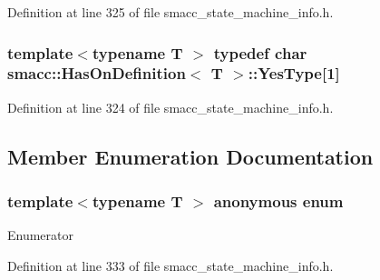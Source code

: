 Definition at line 325 of file smacc\+\_\+state\+\_\+machine\+\_\+info.\+h.

\subsubsection[{\texorpdfstring{Yes\+Type}{YesType}}]{\setlength{\rightskip}{0pt plus 5cm}template$<$typename T $>$ typedef char {\bf smacc\+::\+Has\+On\+Definition}$<$ T $>$\+::Yes\+Type\mbox{[}1\mbox{]}\hspace{0.3cm}{\ttfamily [private]}}\hypertarget{classsmacc_1_1HasOnDefinition_af147416543b9d5a19d3dfc4f3f0d42a6}{}\label{classsmacc_1_1HasOnDefinition_af147416543b9d5a19d3dfc4f3f0d42a6}


Definition at line 324 of file smacc\+\_\+state\+\_\+machine\+\_\+info.\+h.



\subsection{Member Enumeration Documentation}
\subsubsection[{\texorpdfstring{anonymous enum}{anonymous enum}}]{\setlength{\rightskip}{0pt plus 5cm}template$<$typename T $>$ anonymous enum}\hypertarget{classsmacc_1_1HasOnDefinition_a42ed2a75557706765cc75f0454d612db}{}\label{classsmacc_1_1HasOnDefinition_a42ed2a75557706765cc75f0454d612db}
\begin{Desc}
\item[Enumerator]\par
\begin{description}
\item[{\em 
value\hypertarget{classsmacc_1_1HasOnDefinition_a42ed2a75557706765cc75f0454d612dba0ee3bd0e07973c128ab64f02600c7720}{}\label{classsmacc_1_1HasOnDefinition_a42ed2a75557706765cc75f0454d612dba0ee3bd0e07973c128ab64f02600c7720}
}]\end{description}
\end{Desc}


Definition at line 333 of file smacc\+\_\+state\+\_\+machine\+\_\+info.\+h.


